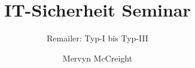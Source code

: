 \documentclass{beamer}
\title[Seminar]{IT-Sicherheit Seminar}
\subtitle[Remailer]{Remailer: Typ-I bis Typ-III}
\author[M. McCreight]{Mervyn McCreight}
\institute[FH-Wedel]{FH-Wedel}
\begin{document}
\frame{\titlepage}
\end{document}
